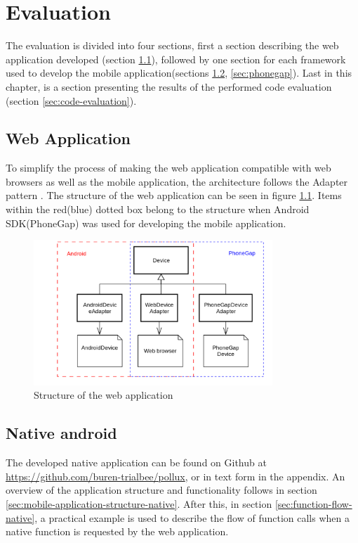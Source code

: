 \chapter{Evaluation}	\label{ch:evaluation}
The evaluation is divided into four sections, first a section describing the web application developed (section \ref{sec:web-application}), followed by one section for each framework used to develop the mobile application(sections \ref{sec:native-android}, \ref{sec:phonegap}). Last in this chapter, is a section presenting the results of the performed code evaluation (section \ref{sec:code-evaluation}).

\section{Web Application}\label{sec:web-application}
To simplify the process of making the web application compatible with web browsers as well as the mobile application, the architecture follows the Adapter pattern \cite[p.~317]{martin2003}. The structure of the web application can be seen in figure \ref{fig:webuml}. Items within the red(blue) dotted box belong to the structure when Android SDK(PhoneGap) was used for developing the mobile application.

\begin{figure}[h!]
	\centering
    \includegraphics[width=90mm,natwidth=600,natheight=450]{./img/webuml.png}
    \caption{Structure of the web application}
	\label{fig:webuml}
\end{figure}

\section{Native android} \label{sec:native-android}
The developed native application can be found on Github at \url{https://github.com/buren-trialbee/pollux}, or in text form in the appendix. An overview of the application structure and functionality follows in section \ref{sec:mobile-application-structure-native}. After this, in section \ref{sec:function-flow-native}, a practical example is used to describe the flow of function calls when a native function is requested by the web application.

